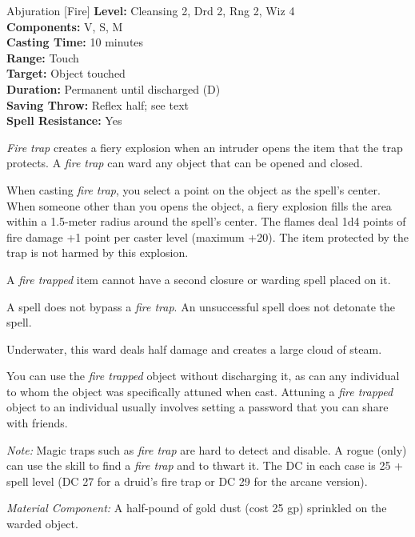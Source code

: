 {Abjuration [Fire]}
{
	\textbf{Level:}
	Cleansing 2, Drd 2, Rng 2, Wiz 4\\
	\textbf{Components:}
	V, S, M\\
	\textbf{Casting Time:}
	10 minutes\\
	\textbf{Range:}
	Touch\\
	\textbf{Target:}
	Object touched\\
	\textbf{Duration:}
	Permanent until discharged (D)\\
	\textbf{Saving Throw:}
	Reflex half; see text\\
	\textbf{Spell Resistance:}
	Yes\\
}
{
	\emph{Fire trap} creates a fiery explosion when an intruder opens the item that the trap protects. A \emph{fire trap} can ward any object that can be opened and closed.

	When casting \emph{fire trap}, you select a point on the object as the spell's center. When someone other than you opens the object, a fiery explosion fills the area within a 1.5-meter radius around the spell's center. The flames deal 1d4 points of fire damage +1 point per caster level (maximum +20). The item protected by the trap is not harmed by this explosion.

	A \emph{fire trapped} item cannot have a second closure or warding spell placed on it.

	A  spell does not bypass a \emph{fire trap}.  An unsuccessful  spell does not detonate the spell.

	Underwater, this ward deals half damage and creates a large cloud of steam.

	You can use the \emph{fire trapped} object without discharging it, as can any individual to whom the object was specifically attuned when cast. Attuning a \emph{fire trapped} object to an individual usually involves setting a password that you can share with friends.

	\textit{Note:} Magic traps such as \emph{fire trap} are hard to detect and disable. A rogue (only) can use the  skill to find a \emph{fire trap} and  to thwart it. The DC in each case is 25 + spell level (DC 27 for a druid's fire trap or DC 29 for the arcane version).

	\textit{Material Component:}
	A half-pound of gold dust (cost 25 gp) sprinkled on the warded object.

}
